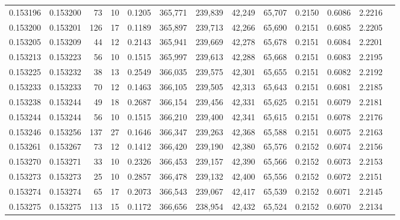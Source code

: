\begin{tabular}{rrrrrrrrrrrrr}
0.153196 & 0.153200 &    73 &  10 &                                     0.1205 & 365,771 & 239,839 &  42,249 &  65,707 & 0.2150 & 0.6086 & 2.2216 \\
0.153200 & 0.153201 &   126 &  17 &                                     0.1189 & 365,897 & 239,713 &  42,266 &  65,690 & 0.2151 & 0.6085 & 2.2205 \\
0.153205 & 0.153209 &    44 &  12 &                                     0.2143 & 365,941 & 239,669 &  42,278 &  65,678 & 0.2151 & 0.6084 & 2.2201 \\
0.153213 & 0.153223 &    56 &  10 &                                     0.1515 & 365,997 & 239,613 &  42,288 &  65,668 & 0.2151 & 0.6083 & 2.2195 \\
0.153225 & 0.153232 &    38 &  13 &                                     0.2549 & 366,035 & 239,575 &  42,301 &  65,655 & 0.2151 & 0.6082 & 2.2192 \\
0.153233 & 0.153233 &    70 &  12 &                                     0.1463 & 366,105 & 239,505 &  42,313 &  65,643 & 0.2151 & 0.6081 & 2.2185 \\
0.153238 & 0.153244 &    49 &  18 &                                     0.2687 & 366,154 & 239,456 &  42,331 &  65,625 & 0.2151 & 0.6079 & 2.2181 \\
0.153244 & 0.153244 &    56 &  10 &                                     0.1515 & 366,210 & 239,400 &  42,341 &  65,615 & 0.2151 & 0.6078 & 2.2176 \\
0.153246 & 0.153256 &   137 &  27 &                                     0.1646 & 366,347 & 239,263 &  42,368 &  65,588 & 0.2151 & 0.6075 & 2.2163 \\
0.153261 & 0.153267 &    73 &  12 &                                     0.1412 & 366,420 & 239,190 &  42,380 &  65,576 & 0.2152 & 0.6074 & 2.2156 \\
0.153270 & 0.153271 &    33 &  10 &                                     0.2326 & 366,453 & 239,157 &  42,390 &  65,566 & 0.2152 & 0.6073 & 2.2153 \\
0.153273 & 0.153273 &    25 &  10 &                                     0.2857 & 366,478 & 239,132 &  42,400 &  65,556 & 0.2152 & 0.6072 & 2.2151 \\
0.153274 & 0.153274 &    65 &  17 &                                     0.2073 & 366,543 & 239,067 &  42,417 &  65,539 & 0.2152 & 0.6071 & 2.2145 \\
0.153275 & 0.153275 &   113 &  15 &                                     0.1172 & 366,656 & 238,954 &  42,432 &  65,524 & 0.2152 & 0.6070 & 2.2134 \\

\end{tabular}
